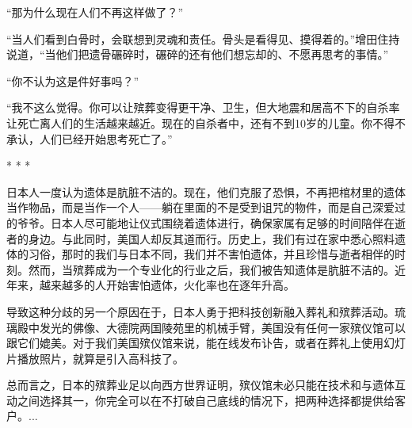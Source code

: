 \documentclass[12pt,oneside]{book}
\begin{document}
\begin{bookref}[frametitle={\cite{好好告别}}]
“那为什么现在人们不再这样做了？”

“当人们看到白骨时，会联想到灵魂和责任。骨头是看得见、摸得着的。”增田住持说道，“当他们把遗骨碾碎时，碾碎的还有他们想忘却的、不愿再思考的事情。”

“你不认为这是件好事吗？”

“我不这么觉得。你可以让殡葬变得更干净、卫生，但大地震和居高不下的自杀率让死亡离人们的生活越来越近。现在的自杀者中，还有不到10岁的儿童。你不得不承认，人们已经开始思考死亡了。”
\begin{center}
* * *
\end{center}

日本人一度认为遗体是肮脏不洁的。现在，他们克服了恐惧，不再把棺材里的遗体当作物品，而是当作一个人——躺在里面的不是受到诅咒的物件，而是自己深爱过的爷爷。日本人尽可能地让仪式围绕着遗体进行，确保家属有足够的时间陪伴在逝者的身边。与此同时，美国人却反其道而行。历史上，我们有过在家中悉心照料遗体的习俗，那时的我们与日本不同，我们并不害怕遗体，并且珍惜与逝者相伴的时刻。然而，当殡葬成为一个专业化的行业之后，我们被告知遗体是肮脏不洁的。近年来，越来越多的人开始害怕遗体，火化率也在逐年升高。

导致这种分歧的另一个原因在于，日本人勇于把科技创新融入葬礼和殡葬活动。琉璃殿中发光的佛像、大德院两国陵苑里的机械手臂，美国没有任何一家殡仪馆可以跟它们媲美。对于我们美国殡仪馆来说，能在线发布讣告，或者在葬礼上使用幻灯片播放照片，就算是引入高科技了。

总而言之，日本的殡葬业足以向西方世界证明，殡仪馆未必只能在技术和与遗体互动之间选择其一，你完全可以在不打破自己底线的情况下，把两种选择都提供给客户。...

\end{bookref}
\end{document}
